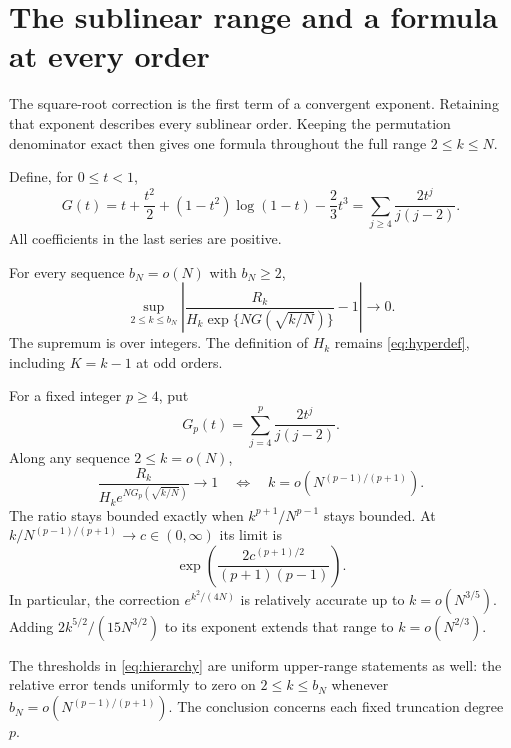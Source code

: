 \section{The sublinear range and a formula at every order}\label{sec:asymptotics}

The square-root correction is the first term of a convergent exponent. Retaining that exponent describes every sublinear order. Keeping the permutation denominator exact then gives one formula throughout the full range $2\le k\le N$.

Define, for $0\le t<1$,
\begin{equation}\label{eq:actionG}
G(t)=t+\frac{t^2}{2}+(1-t^2)\log(1-t)-\frac23t^3
=\sum_{j\ge4}\frac{2t^j}{j(j-2)}.
\end{equation}
All coefficients in the last series are positive.

\begin{theorem}\label{thm:sublinear}
For every sequence $b_N=o(N)$ with $b_N\ge2$,
\begin{equation}\label{eq:sublinear}
\sup_{2\le k\le b_N}
\left|\frac{R_k}{H_k\exp\{NG(\sqrt{k/N})\}}-1\right|
\longrightarrow0.
\end{equation}
The supremum is over integers. The definition of $H_k$ remains \eqref{eq:hyperdef}, including $K=k-1$ at odd orders.
\end{theorem}

\begin{corollary}\label{cor:hierarchy}
For a fixed integer $p\ge4$, put
\[
G_p(t)=\sum_{j=4}^{p}\frac{2t^j}{j(j-2)}.
\]
Along any sequence $2\le k=o(N)$,
\begin{equation}\label{eq:hierarchy}
\frac{R_k}{H_ke^{NG_p(\sqrt{k/N})}}\longrightarrow1
\quad\Longleftrightarrow\quad
k=o\left(N^{(p-1)/(p+1)}\right).
\end{equation}
The ratio stays bounded exactly when $k^{p+1}/N^{p-1}$ stays bounded. At $k/N^{(p-1)/(p+1)}\to c\in(0,\infty)$ its limit is
\begin{equation}\label{eq:hierarchyboundary}
\exp\left(\frac{2c^{(p+1)/2}}{(p+1)(p-1)}\right).
\end{equation}
In particular, the correction $e^{k^2/(4N)}$ is relatively accurate up to $k=o(N^{3/5})$. Adding $2k^{5/2}/(15N^{3/2})$ to its exponent extends that range to $k=o(N^{2/3})$.
\end{corollary}

The thresholds in \eqref{eq:hierarchy} are uniform upper-range statements as well: the relative error tends uniformly to zero on $2\le k\le b_N$ whenever $b_N=o(N^{(p-1)/(p+1)})$. The conclusion concerns each fixed truncation degree $p$.

